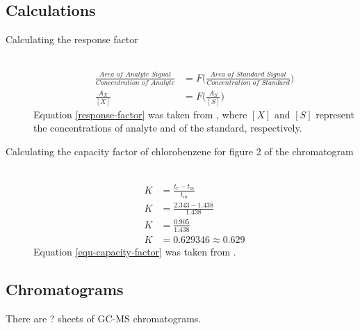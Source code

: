 \documentclass[a4paper, 12pt]{article}
\begin{document}
\subsection{Calculations}


\begin{description}

	\item[Calculating the response factor] \hfill \\
		\begin{equation} \label{response-factor}
			\begin{split}
				\frac{\textit{Area of Analyte Signal}}{\textit{Concentration of Analyte}} & = F\Bigg(\frac{\textit{Area of Standard Signal}}{\textit{Concentration of Standard}}\Bigg) \\
				\frac{A_X}{[X]} & = F\Bigg(\frac{A_S}{[S]}\Bigg)
			\end{split}
		\end{equation}
		Equation \ref{response-factor} was taken from \cite{harris}, where $[X]$ and $[S]$ represent the concentrations of analyte and of the standard, respectively.

	\item[Calculating the capacity factor of chlorobenzene for figure 2 of the chromatogram] \hfill \\
		\begin{equation} \label{equ-capacity-factor}
			\begin{split}
				K & = \frac{t_r - t_m}{t_m} \\
				K & = \frac{2.343 - 1.438}{1.438} \\
				K & = \frac{0.905}{1.438} \\
				K & = 0.629346 \approx 0.629
			\end{split}
		\end{equation}
		Equation \ref{equ-capacity-factor} was taken from \cite{harris}.

\end{description}


\subsection{Chromatograms}
There are ? sheets of GC-MS chromatograms.

\end{document}

